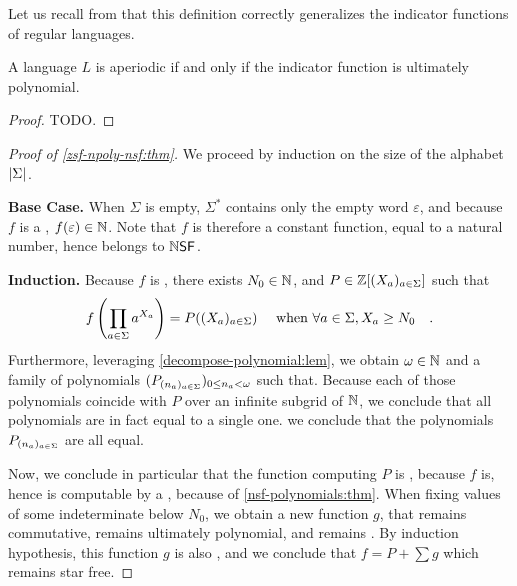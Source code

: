 Let us recall from \cite{LOPEZ23b} that this definition correctly
generalizes the indicator functions of regular languages.

\begin{example}
    A language $L$ is aperiodic if and only if 
    the indicator function is ultimately polynomial.
\end{example}
\begin{proof}
    TODO.
\end{proof}

\begin{proof}[Proof of \cref{zsf-npoly-nsf:thm}]
    We proceed by induction on the size of the alphabet $\card{\Sigma}$.

    \textbf{Base Case.} When $\Sigma$ is empty, $\Sigma^*$ contains
    only the empty word $\varepsilon$, and because $f$ is a
    , $f(\varepsilon) \in \mathbb{N}$.
    Note that $f$ is therefore a constant function, equal to a natural
    number, hence belongs to $\NSF$.

    
    \textbf{Induction.}
    Because $f$ is ,
    there exists $N_0 \in \mathbb{N}$, 
    and $P \in \mathbb{Z}[(X_a)_{a \in \Sigma}]$ 
    such that
    \begin{equation*}
        f\left( \prod_{a \in \Sigma} a^{X_a} \right)
        = 
        P((X_a)_{a \in \Sigma})
        \quad
        \text{ when }
        \forall a \in \Sigma, X_a \geq N_0
        \quad .
    \end{equation*}
    Furthermore, leveraging \cref{decompose-polynomial:lem},
    we obtain $\omega \in \mathbb{N}$
    and a family of polynomials 
    $(P_{(n_a)_{a \in \Sigma}})_{0 \leq n_a < \omega}$
    such that.
    Because each of those polynomials coincide with $P$ over an infinite
    subgrid of $\mathbb{N}$,
    we conclude that all polynomials are in fact equal to a single one.
    we conclude that the polynomials 
    $P_{(n_a)_{a \in \Sigma}}$ are all equal.

    Now, we conclude in particular that the function 
    computing $P$ is , because $f$ is,
    hence is computable by a ,
    because of \cref{nsf-polynomials:thm}.
    When fixing values of some indeterminate below $N_0$,
    we obtain a new function $g$, that remains commutative,
    remains ultimately polynomial, and remains .
    By induction hypothesis, this function $g$ is also 
    , and we conclude
    that 
    $f = P + \sum g$ which remains star free.
\end{proof}


